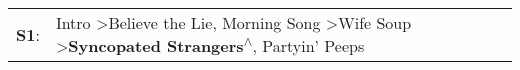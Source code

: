 \begin{supertabular}{p{0.03\textwidth}p{0.92\textwidth}}
 \textbf{S1}:  &  Intro\textsuperscript{} \textgreater \enspace Believe the Lie\textsuperscript{}, \enspace Morning Song\textsuperscript{} \textgreater \enspace Wife Soup\textsuperscript{} \textgreater \enspace \textbf{Syncopated Strangers\textsuperscript{$\wedge$}}, \enspace Partyin' Peeps\textsuperscript{}  \enspace  \\
\end{supertabular}

